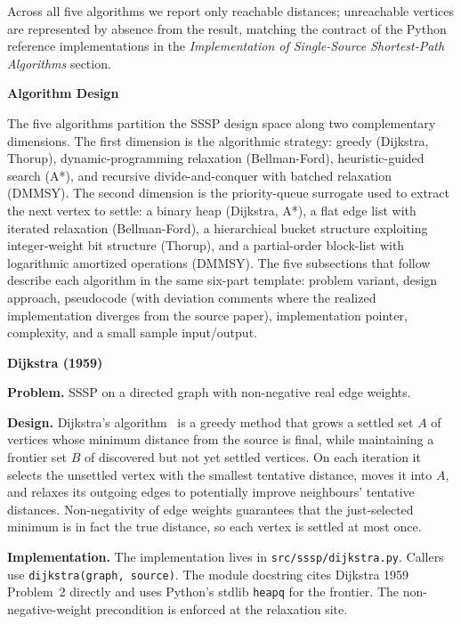 \documentclass[12pt]{article}
\begin{document}
\newpage
Across all five algorithms we report only reachable distances; unreachable vertices are represented by absence from the result, matching the contract of the Python reference implementations in the \textit{Implementation of Single-Source Shortest-Path Algorithms} section.

\medskip
\noindent\textbf{Algorithm Design}\label{sec:algorithm-design}
\medskip

The five algorithms partition the SSSP design space along two complementary dimensions. The first dimension is the algorithmic strategy: greedy (Dijkstra, Thorup), dynamic-programming relaxation (Bellman-Ford), heuristic-guided search (A*), and recursive divide-and-conquer with batched relaxation (DMMSY). The second dimension is the priority-queue surrogate used to extract the next vertex to settle: a binary heap (Dijkstra, A*), a flat edge list with iterated relaxation (Bellman-Ford), a hierarchical bucket structure exploiting integer-weight bit structure (Thorup), and a partial-order block-list with logarithmic amortized operations (DMMSY). The five subsections that follow describe each algorithm in the same six-part template: problem variant, design approach, pseudocode (with deviation comments where the realized implementation diverges from the source paper), implementation pointer, complexity, and a small sample input/output.

\newpage
\noindent\textbf{Dijkstra (1959)}\label{sec:algo-dijkstra}
\medskip

\textbf{Problem.} SSSP on a directed graph with non-negative real edge weights.
\medskip

\textbf{Design.} Dijkstra's algorithm~\cite{dijkstra1959note} is a greedy method that grows a settled set $A$ of vertices whose minimum distance from the source is final, while maintaining a frontier set $B$ of discovered but not yet settled vertices. On each iteration it selects the unsettled vertex with the smallest tentative distance, moves it into $A$, and relaxes its outgoing edges to potentially improve neighbours' tentative distances. Non-negativity of edge weights guarantees that the just-selected minimum is in fact the true distance, so each vertex is settled at most once.
\medskip

{\raggedright\setlength{\parindent}{0.5in}
\indent\textbf{Implementation.} The implementation lives in \texttt{src/sssp/dijkstra.py}. Callers use \texttt{dijkstra(graph, source)}. The module docstring cites Dijkstra 1959 Problem~2 directly and uses Python's stdlib \texttt{heapq} for the frontier. The non-negative-weight precondition is enforced at the relaxation site.
\par}
\medskip
\end{document}
